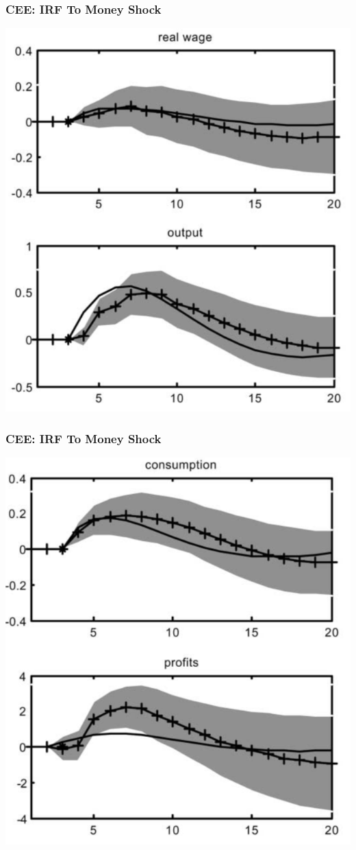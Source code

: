 \documentclass[english,xcolor=svgnames]{beamer}
\begin{document}
\begin{frame}
\frametitle{CEE: IRF To Money Shock
}
\centering
\includegraphics[scale=0.6]{../../Images/CEE2005-3.png}
\end{frame}

\begin{frame}
\frametitle{CEE: IRF To Money Shock
}
\centering
\includegraphics[scale=0.6]{../../Images/CEE2005-4.png}
\end{frame}
\end{document}
